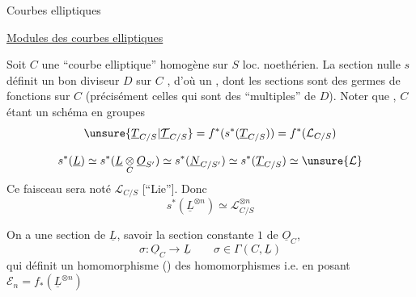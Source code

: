 
Courbes elliptiques



\uline{Modules des courbes elliptiques}

Soit $C$ une ``courbe elliptique'' homogène sur $S$ loc. noethérien. La section nulle $s$ définit un bon diviseur $D$ sur $C$ , d'où un ,  dont les  sections sont des  germes de fonctions sur $C$ (précisément celles qui sont des ``multiples'' de $D$). Noter que , $C$ étant un schéma en groupes
\[
\unsure{\underline T_{C/S}|\underline{\mathcal T}_{C/S}}=f^*(s^*(\underline T_{C/S}))=f^*(\mathcal L_{C/S})
\]

\[
s^*(\underline L)\simeq s^*(\underline L\underset C\otimes\underline O_{S'})\simeq s^*(\underline N_{C/S'})\simeq s^*(\underline T_{C/S})\simeq\unsure{\mathcal L}
\]
Ce faisceau sera noté $\mathcal L_{C/S}$ [``Lie'']. Donc
\[
s^*(\underline L^{\otimes n})\simeq\mathcal L_{C/S}^{\otimes n}
\]

On a une section  de $\underline L$, savoir la section constante $1$ de $\underline O_C$,
\[
\sigma:\underline O_C\longrightarrow\underline L\qquad \sigma\in\Gamma(C,\underline L)
\]
qui définit un homomorphisme ()
  des homomorphismes
i.e.
en posant $\mathcal E_n=f_*(\underline L^{\otimes n})$

